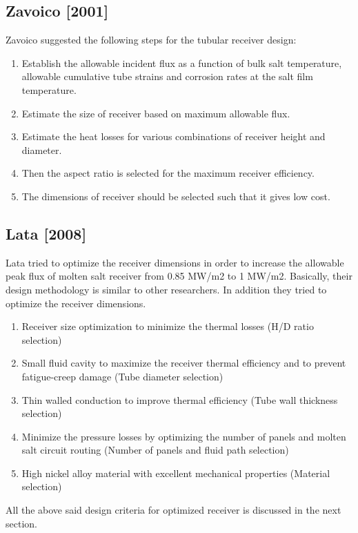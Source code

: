 \subsection{Zavoico [2001]}
Zavoico\cite{Zavoico.2001} suggested the following steps for the tubular receiver design: 
\begin{enumerate}
	\item Establish the allowable incident flux as a function of bulk salt temperature, allowable cumulative tube strains and corrosion rates at the salt film temperature.
	\item Estimate the size of receiver based on maximum allowable flux.
	\item Estimate the heat losses for various combinations of receiver height and diameter. 
	\item Then the aspect ratio is selected for the maximum receiver efficiency.
	\item The dimensions of receiver should be selected such that it gives low cost.
\end{enumerate}
\subsection{Lata [2008]}
Lata\cite{Lata.2008} tried to optimize the receiver dimensions in order to increase the allowable peak flux of molten salt receiver from 0.85 MW/m2 to 1 MW/m2. Basically, their design methodology is similar to other researchers. In addition they tried to optimize the receiver dimensions.
\begin{enumerate}
	\item Receiver size optimization to minimize the thermal losses (H/D ratio selection)
	\item Small fluid cavity to maximize the receiver thermal efficiency and to prevent fatigue-creep damage (Tube diameter selection)
	\item Thin walled conduction to improve thermal efficiency (Tube wall thickness selection)
	\item Minimize the pressure losses by optimizing the number of panels and molten salt circuit routing (Number of panels and fluid path selection)
	\item High nickel alloy material with excellent mechanical properties (Material selection)
\end{enumerate}
All the above said design criteria for optimized receiver is discussed in the next section.
